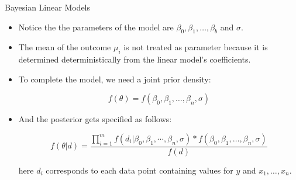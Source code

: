 \documentclass[handout]{beamer}
\begin{document}
\begin{frame}{Bayesian Linear Models}
\scriptsize{
\begin{itemize}


\item Notice the the parameters of the model are $\beta_0,\beta_1,\dots,\beta_b$ and $\sigma$.

\item The mean of the outcome $\mu_i$ is not treated as parameter because it is determined deterministically from the linear model's coefficients.

\item To complete the model, we need a joint prior density:

\begin{displaymath}
f(\theta)= f(\beta_0,\beta_1,\dots,\beta_n,\sigma)
\end{displaymath}

\item And the posterior gets specified as follows:

\begin{displaymath}
f(\theta|d)= \frac{ \prod_{i=1}^m f(d_i|\beta_0,\beta_1,\cdots,\beta_n,\sigma)*f(\beta_0,\beta_1,\dots,\beta_n,\sigma)}{f(d)}
\end{displaymath}


here $d_i$ corresponds to each data point containing values for $y$ and $x_1,\dots,x_n$.







 
\end{itemize}



} 

\end{frame}
\end{document}
